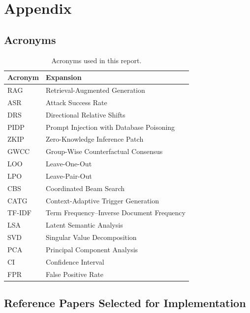 \appendix
\section*{Appendix}
\renewcommand{\thesubsection}{\Alph{subsection}}

\subsection{Acronyms}

\begin{table}[htbp]
\centering
\small
\begin{tabularx}{0.7\textwidth}{@{}l Y@{}}
\toprule
\textbf{Acronym} & \textbf{Expansion} \\
\midrule
RAG & Retrieval-Augmented Generation \\
ASR & Attack Success Rate \\
DRS & Directional Relative Shifts \\
PIDP & Prompt Injection with Database Poisoning \\
ZKIP & Zero-Knowledge Inference Patch \\
GWCC & Group-Wise Counterfactual Consensus \\
LOO & Leave-One-Out \\
LPO & Leave-Pair-Out \\
CBS & Coordinated Beam Search \\
CATG & Context-Adaptive Trigger Generation \\
TF-IDF & Term Frequency--Inverse Document Frequency \\
LSA & Latent Semantic Analysis \\
SVD & Singular Value Decomposition \\
PCA & Principal Component Analysis \\
CI & Confidence Interval \\
FPR & False Positive Rate \\
\bottomrule
\end{tabularx}
\caption{Acronyms used in this report.}
\label{tab:acronyms}
\end{table}

\subsection{Reference Papers Selected for Implementation}

